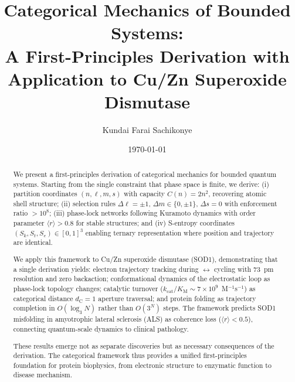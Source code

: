 \documentclass[twocolumn,aps,prx,superscriptaddress,longbibliography]{revtex4-2}
\theoremstyle{remark}
\newcommand{\Sk}{S_k}
\newcommand{\St}{S_t}
\newcommand{\Se}{S_e}
\newcommand{\kcat}{k_\text{cat}}
\newcommand{\Km}{K_\text{M}}
\newcommand{\dC}{d_\text{C}}
\newcommand{\orderpar}{\langle r \rangle}
\begin{document}
\title{Categorical Mechanics of Bounded Systems:\\
A First-Principles Derivation with Application to Cu/Zn Superoxide Dismutase}

\author{Kundai Farai Sachikonye}

\date{\today}

\begin{abstract}
We present a first-principles derivation of categorical mechanics for bounded
quantum systems. Starting from the single constraint that phase space is finite,
we derive: (i) partition coordinates $(n, \ell, m, s)$ with capacity $C(n) = 2n^2$,
recovering atomic shell structure; (ii) selection rules $\Delta\ell = \pm 1$,
$\Delta m \in \{0, \pm 1\}$, $\Delta s = 0$ with enforcement ratio $>10^8$;
(iii) phase-lock networks following Kuramoto dynamics with order parameter
$\orderpar > 0.8$ for stable structures; and (iv) S-entropy coordinates
$(\Sk, \St, \Se) \in [0,1]^3$ enabling ternary representation where position
and trajectory are identical.

We apply this framework to Cu/Zn superoxide dismutase (SOD1), demonstrating
that a single derivation yields: electron trajectory tracking during
 $\leftrightarrow$  cycling with 73~pm resolution and
zero backaction; conformational dynamics of the electrostatic loop as
phase-lock topology changes; catalytic turnover
($\kcat/\Km \sim 7 \times 10^9$~M$^{-1}$s$^{-1}$) as categorical distance
$\dC = 1$ aperture traversal; and protein folding as trajectory completion
in $O(\log_3 N)$ rather than $O(3^N)$ steps. The framework predicts SOD1
misfolding in amyotrophic lateral sclerosis (ALS) as coherence loss
($\orderpar < 0.5$), connecting quantum-scale dynamics to clinical pathology.

These results emerge not as separate discoveries but as necessary consequences
of the derivation. The categorical framework thus provides a unified
first-principles foundation for protein biophysics, from electronic structure
to enzymatic function to disease mechanism.
\end{abstract}

\maketitle

\end{document}
